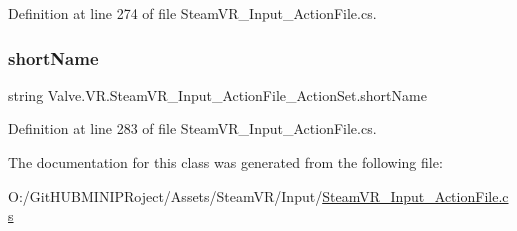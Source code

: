 Definition at line 274 of file Steam\+V\+R\+\_\+\+Input\+\_\+\+Action\+File.\+cs.

\mbox{\label{class_valve_1_1_v_r_1_1_steam_v_r___input___action_file___action_set_a69d2b8a84920be81664451a426e6f59e}} 
\subsubsection{\texorpdfstring{shortName}{shortName}}
{\footnotesize\ttfamily string Valve.\+V\+R.\+Steam\+V\+R\+\_\+\+Input\+\_\+\+Action\+File\+\_\+\+Action\+Set.\+short\+Name\hspace{0.3cm}{\ttfamily [get]}}



Definition at line 283 of file Steam\+V\+R\+\_\+\+Input\+\_\+\+Action\+File.\+cs.



The documentation for this class was generated from the following file\+:\begin{DoxyCompactItemize}
\item 
O\+:/\+Git\+H\+U\+B\+M\+I\+N\+I\+P\+Roject/\+Assets/\+Steam\+V\+R/\+Input/\mbox{\hyperlink{_steam_v_r___input___action_file_8cs}{Steam\+V\+R\+\_\+\+Input\+\_\+\+Action\+File.\+cs}}\end{DoxyCompactItemize}
